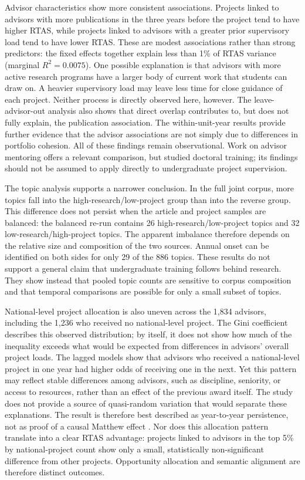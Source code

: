 \documentclass[pdflatex,sn-apa]{sn-jnl}
\begin{document}
Advisor characteristics show more consistent associations. Projects linked to advisors with more publications in the three years before the project tend to have higher RTAS, while projects linked to advisors with a greater prior supervisory load tend to have lower RTAS. These are modest associations rather than strong predictors: the fixed effects together explain less than 1\% of RTAS variance (marginal $R^2=0.0075$). One possible explanation is that advisors with more active research programs have a larger body of current work that students can draw on. A heavier supervisory load may leave less time for close guidance of each project. Neither process is directly observed here, however. The leave-advisor-out analysis also shows that direct overlap contributes to, but does not fully explain, the publication association. The within-unit-year results provide further evidence that the advisor associations are not simply due to differences in portfolio cohesion. All of these findings remain observational. Work on advisor mentoring offers a relevant comparison, but \citet{paglis2006adviser} studied doctoral training; its findings should not be assumed to apply directly to undergraduate project supervision.

The topic analysis supports a narrower conclusion. In the full joint corpus, more topics fall into the high-research/low-project group than into the reverse group. This difference does not persist when the article and project samples are balanced: the balanced re-run contains 26 high-research/low-project topics and 32 low-research/high-project topics. The apparent imbalance therefore depends on the relative size and composition of the two sources. Annual onset can be identified on both sides for only 29 of the 886 topics. These results do not support a general claim that undergraduate training follows behind research. They show instead that pooled topic counts are sensitive to corpus composition and that temporal comparisons are possible for only a small subset of topics.

National-level project allocation is also uneven across the 1,834 advisors, including the 1,236 who received no national-level project. The Gini coefficient describes this observed distribution; by itself, it does not show how much of the inequality exceeds what would be expected from differences in advisors' overall project loads. The lagged models show that advisors who received a national-level project in one year had higher odds of receiving one in the next. Yet this pattern may reflect stable differences among advisors, such as discipline, seniority, or access to resources, rather than an effect of the previous award itself. The study does not provide a source of quasi-random variation that would separate these explanations. The result is therefore best described as year-to-year persistence, not as proof of a causal Matthew effect \citep{merton1968matthew,merton1988matthewii,allison1982cumulative,diprete2006cumulative}. Nor does this allocation pattern translate into a clear RTAS advantage: projects linked to advisors in the top 5\% by national-project count show only a small, statistically non-significant difference from other projects. Opportunity allocation and semantic alignment are therefore distinct outcomes.
\end{document}
